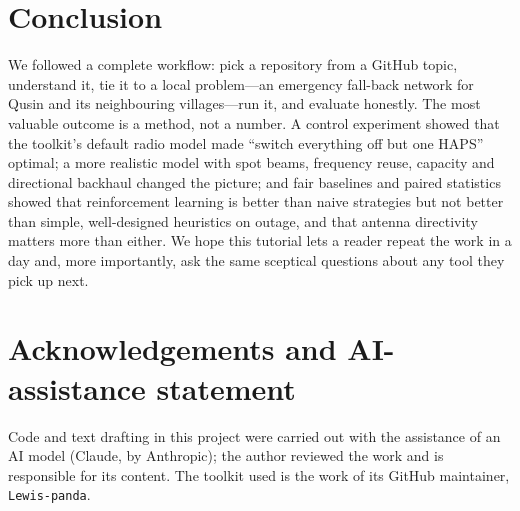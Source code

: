 \documentclass[11pt,a4paper]{article}
\begin{document}
\section{Conclusion}
\label{sec:conclusion}

We followed a complete workflow: pick a repository from a GitHub topic, understand it, tie it to a local problem---an emergency fall-back network for Qusin and its neighbouring villages---run it, and evaluate honestly. The most valuable outcome is a method, not a number. A control experiment showed that the toolkit's default radio model made ``switch everything off but one HAPS'' optimal; a more realistic model with spot beams, frequency reuse, capacity and directional backhaul changed the picture; and fair baselines and paired statistics showed that reinforcement learning is better than naive strategies but not better than simple, well-designed heuristics on outage, and that antenna directivity matters more than either. We hope this tutorial lets a reader repeat the work in a day and, more importantly, ask the same sceptical questions about any tool they pick up next.

\section*{Acknowledgements and AI-assistance statement}
Code and text drafting in this project were carried out with the assistance of an AI model (Claude, by Anthropic); the author reviewed the work and is responsible for its content. The toolkit used is the work of its GitHub maintainer, \texttt{Lewis-panda}.
\end{document}
